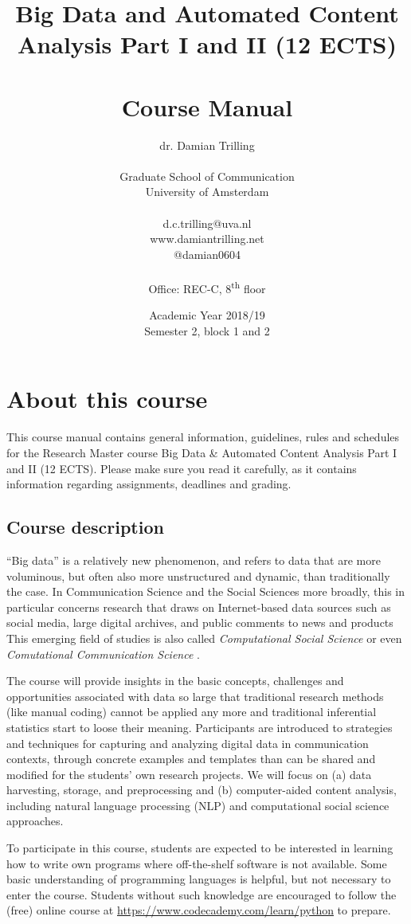 \documentclass[a4paper,10pt]{report}
\title{Big Data and Automated Content Analysis Part I and II (12 ECTS)\\~\\Course Manual}
\author{dr. Damian Trilling\\~\\Graduate School of Communication\\University of Amsterdam\\~\\d.c.trilling@uva.nl\\www.damiantrilling.net\\@damian0604\\~\\Office: REC-C, 8\textsuperscript{th} floor}
\date{Academic Year 2018/19\\Semester 2, block 1 and 2}
\begin{document}
\maketitle



\chapter{About this course}

This course manual contains general information, guidelines, rules and schedules for the Research Master course Big Data \& Automated Content Analysis Part I and II (12 ECTS). Please make sure you read it carefully, as it  contains information regarding assignments, deadlines and grading.

\section{Course description}
 
``Big data'' is a relatively new phenomenon, and refers to data that are more voluminous, but often also more unstructured and dynamic, than traditionally the case. In Communication Science and the Social Sciences more broadly, this in particular concerns research that draws on Internet-based data sources such as social media, large digital archives, and public comments to news and products This emerging field of studies is also called \emph{Computational Social Science} \citep{Lazer2009} or even \emph{Comutational Communication Science} \citep{Shah2015}.


The course will provide insights in the basic concepts, challenges and opportunities associated with data so large that traditional research methods (like manual coding) cannot be applied any more and traditional inferential statistics start to loose their meaning. Participants are introduced to strategies and techniques for capturing and analyzing digital data in communication contexts, through concrete examples and templates than can be shared and modified for the students’ own research projects. We will focus on (a) data harvesting, storage, and preprocessing and (b) computer-aided content analysis, including natural language processing (NLP) and computational social science approaches.

To participate in this course, students are expected to be interested in learning how to write own programs where off-the-shelf software is not available. Some basic understanding of programming languages is helpful, but not necessary to enter the course. Students without such knowledge are encouraged to follow the (free) online course at \url{https://www.codecademy.com/learn/python} to prepare.
\end{document}
